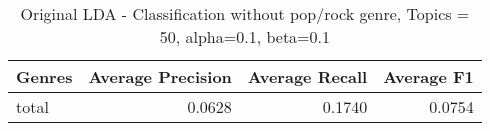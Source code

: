 \begin{table}[h]
\begin{tabular}{|l|r|r|r|}

\hline
\textbf{Genres} &  \textbf{Average Precision} & \textbf{Average Recall} & \textbf{Average F1} \\
\hline
total& 0.0628& 	0.1740& 	0.0754\\
\hline
\end{tabular}
\caption{Original LDA - Classification without pop/rock genre, Topics = 50, alpha=0.1, beta=0.1}
\end{table}